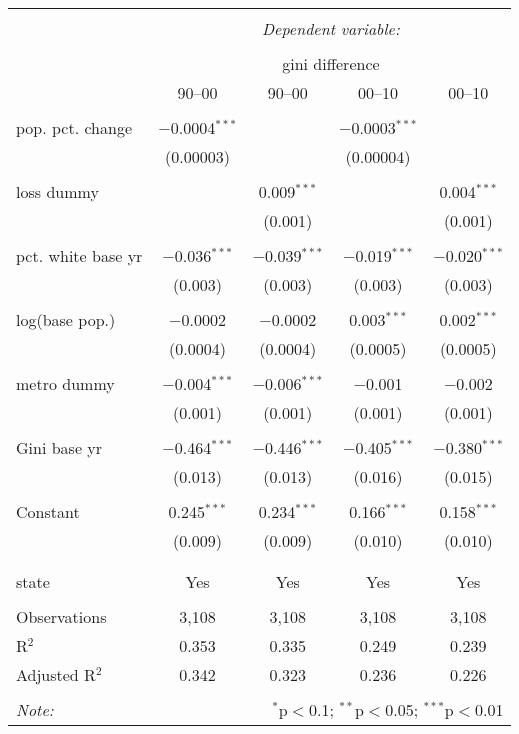 \documentclass{standalone}
\begin{document}
\begin{tabular}{@{\extracolsep{5pt}}lcccc} 
\\[-1.8ex]\hline 
\hline \\[-1.8ex] 
 & \multicolumn{4}{c}{\textit{Dependent variable:}} \\ 
\cline{2-5} 
\\[-1.8ex] & \multicolumn{4}{c}{gini difference} \\ 
 & 90--00 & 90--00 & 00--10 & 00--10 \\ 
\hline \\[-1.8ex] 
 pop. pct. change & $-$0.0004$^{***}$ &  & $-$0.0003$^{***}$ &  \\ 
  & (0.00003) &  & (0.00004) &  \\ 
  & & & & \\ 
 loss dummy &  & 0.009$^{***}$ &  & 0.004$^{***}$ \\ 
  &  & (0.001) &  & (0.001) \\ 
  & & & & \\ 
 pct. white base yr & $-$0.036$^{***}$ & $-$0.039$^{***}$ & $-$0.019$^{***}$ & $-$0.020$^{***}$ \\ 
  & (0.003) & (0.003) & (0.003) & (0.003) \\ 
  & & & & \\ 
 log(base pop.) & $-$0.0002 & $-$0.0002 & 0.003$^{***}$ & 0.002$^{***}$ \\ 
  & (0.0004) & (0.0004) & (0.0005) & (0.0005) \\ 
  & & & & \\ 
 metro dummy & $-$0.004$^{***}$ & $-$0.006$^{***}$ & $-$0.001 & $-$0.002 \\ 
  & (0.001) & (0.001) & (0.001) & (0.001) \\ 
  & & & & \\ 
 Gini base yr & $-$0.464$^{***}$ & $-$0.446$^{***}$ & $-$0.405$^{***}$ & $-$0.380$^{***}$ \\ 
  & (0.013) & (0.013) & (0.016) & (0.015) \\ 
  & & & & \\ 
 Constant & 0.245$^{***}$ & 0.234$^{***}$ & 0.166$^{***}$ & 0.158$^{***}$ \\ 
  & (0.009) & (0.009) & (0.010) & (0.010) \\ 
  & & & & \\ 
\hline \\[-1.8ex] 
state & Yes & Yes & Yes & Yes \\ 
\hline \\[-1.8ex] 
Observations & 3,108 & 3,108 & 3,108 & 3,108 \\ 
R$^{2}$ & 0.353 & 0.335 & 0.249 & 0.239 \\ 
Adjusted R$^{2}$ & 0.342 & 0.323 & 0.236 & 0.226 \\ 
\hline 
\hline \\[-1.8ex] 
\textit{Note:}  & \multicolumn{4}{r}{$^{*}$p$<$0.1; $^{**}$p$<$0.05; $^{***}$p$<$0.01} \\ 
\end{tabular} 
\end{document}
